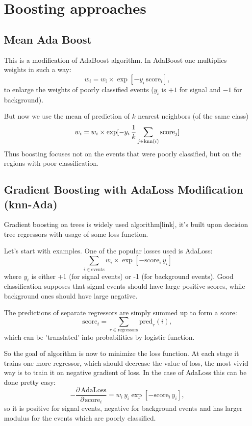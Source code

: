 \section{Boosting approaches}
\subsection{Mean Ada Boost}

This is a modification of AdaBoost algorithm. In AdaBoost one multiplies weights in such a way:
\[
	w_i = w_i \times \exp[-y_i \, \text{score}_i],
\]
to enlarge the weights of poorly classified events ($y_i$ is $+1$ for signal and $-1$ for background).

But now we use the mean of prediction of $k$ nearest neighbors (of the same class)
\[
	w_i = w_i \times \exp[-y_i \, \dfrac{1}{k} \sum_{j \in \text{knn}(i)} \text{score}_j]
\]
Thus boosting focuses not on the events that were poorly classified, but on the regions with poor classification.


\subsection{Gradient Boosting with AdaLoss Modification (knn-Ada)}

\def\score{\text{score}}
\def\knn{\text{knn}}
\def\FL{\text{FL}}

Gradient boosting on trees is widely used algorithm[link], it's built upon decision tree regressors with usage of some loss function. 

Let's start with examples. One of the popular losses used is AdaLoss:
\[
	\sum_{i \in \text{events}} w_i \times \exp [- \score_i \, y_i] 
\]
where $y_i$ is either +1 (for signal events) or -1 (for background events). Good classification supposes that signal events should have large positive scores, while background ones should have large negative.

The predictions of separate regressors are simply summed up to form a score:
\[
	\score_i = \sum_{r \in \text{regressors}} \text{pred}_r(i),
\]
which can be 'translated' into probabilities by logistic function.

So the goal of algorithm is now to minimize the loss function. At each stage it trains one more regressor, which should decrease the value of loss, the most vivid way is to train it on negative gradient of loss. In the case of AdaLoss this can be done pretty easy:
\[
	-\dfrac{\partial \, \text{AdaLoss}}{\partial \, \score_i} = w_i \, y_i \exp[- \score_i \, y_i],
\]
so it is positive for signal events, negative for background events and has larger modulus for the events which are poorly classified.

